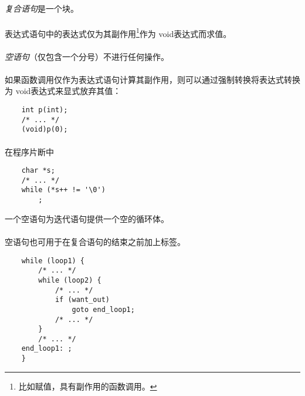 \semantic
\paragraph{}
\textit{复合语句}是一个块。

\syntax
\paragraph{}

\semantic
\paragraph{}
表达式语句中的表达式仅为其副作用\footnote{比如赋值，具有副作用的函数调用。}作为
void表达式而求值。

\paragraph{}
\textit{空语句}（仅包含一个分号）不进行任何操作。

\paragraph{}
\ex 如果函数调用仅作为表达式语句计算其副作用，则可以通过强制转换将表达式转换为
void表达式来显式放弃其值：
\begin{lstlisting}
    int p(int);
    /* ... */
    (void)p(0);
\end{lstlisting}

\paragraph{}
\ex 在程序片断中
\begin{lstlisting}
    char *s;
    /* ... */
    while (*s++ != '\0')
        ;
\end{lstlisting}
一个空语句为迭代语句提供一个空的循环体。

\paragraph{}
\ex 空语句也可用于在复合语句的结束\tm{\}}之前加上标签。
\begin{lstlisting}
    while (loop1) {
        /* ... */
        while (loop2) {
            /* ... */
            if (want_out)
                goto end_loop1;
            /* ... */
        }
        /* ... */
    end_loop1: ;
    }
\end{lstlisting}

